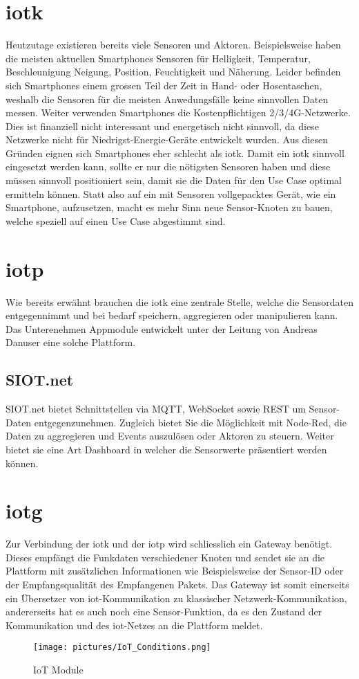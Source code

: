\section{\gls{iotk}}
Heutzutage existieren bereits viele Sensoren und Aktoren. Beispielsweise haben die meisten aktuellen Smartphones Sensoren für Helligkeit, Temperatur, Beschleunigung Neigung, Position, Feuchtigkeit und Näherung. Leider befinden sich Smartphones einem grossen Teil der Zeit in Hand- oder Hosentaschen, weshalb die Sensoren für die meisten Anwedungsfälle keine sinnvollen Daten messen. Weiter verwenden  Smartphones die Kostenpflichtigen 2/3/4G-Netzwerke. Dies ist finanziell nicht interessant und energetisch nicht sinnvoll, da diese Netzwerke nicht für Niedrigst-Energie-Geräte entwickelt wurden. Aus diesen Gründen eignen sich Smartphones eher schlecht als \gls{iotk}. Damit ein \gls{iotk} sinnvoll eingesetzt werden kann, sollte er nur die nötigsten Sensoren haben und diese müssen sinnvoll positioniert sein, damit sie die Daten für den Use Case optimal ermitteln können. Statt also auf ein mit Sensoren vollgepacktes Gerät, wie ein Smartphone, aufzusetzen, macht es mehr Sinn neue Sensor-Knoten zu bauen, welche speziell auf einen Use Case abgestimmt sind.

\section{\gls{iotp}}
Wie bereits erwähnt brauchen die \gls{iotk} eine zentrale Stelle, welche die Sensordaten entgegennimmt und bei bedarf speichern, aggregieren oder manipulieren kann. Das Unterenehmen Appmodule entwickelt unter der Leitung von Andreas Danuser eine solche Plattform. 
\subsection*{SIOT.net}
SIOT.net bietet Schnittstellen via MQTT, WebSocket sowie REST um Sensor-Daten entgegenzunehmen. Zugleich bietet Sie die Möglichkeit mit Node-Red, die Daten zu aggregieren und Events auszulösen oder Aktoren zu steuern. Weiter bietet sie eine Art Dashboard in welcher die Sensorwerte präsentiert werden können.

\section{\gls{iotg}}
Zur Verbindung der \gls{iotk} und der \gls{iotp} wird schliesslich ein Gateway benötigt. Dieses empfängt die Funkdaten verschiedener Knoten und sendet sie an die Plattform mit zusätzlichen Informationen wie Beispielsweise der Sensor-ID oder der Empfangsqualität des Empfangenen Pakets. Das Gateway ist somit einerseits ein Übersetzer von \gls{iot}-Kommunikation zu klassischer Netzwerk-Kommunikation, andererseits hat es auch noch eine Sensor-Funktion, da es den Zustand der Kommunikation und des \gls{iot}-Netzes an die Plattform meldet. 

\begin{figure}[H]
    \centering
        \texttt{[image: pictures/IoT\_Conditions.png]}
    \caption{IoT Module}
    \label{fig:IoT Module}
\end{figure}

